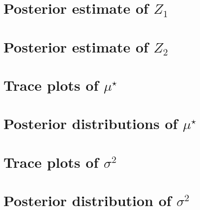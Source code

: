 \documentclass[10pt]{article} %
\begin{document}
\newpage
\section{Posterior estimate of $Z_1$}
\begin{figure}[H]
  \begin{center}  %
  \end{center}
\end{figure}

\newpage
\section{Posterior estimate of $Z_2$}
\begin{figure}[H]
  \begin{center}  %
  \end{center}
\end{figure}

\newpage
\section{Trace plots of $\mu^\star$}
\begin{figure}[H]
  \begin{center}  %
  \end{center}
\end{figure}

\newpage
\section{Posterior distributions of $\mu^\star$}
\begin{figure}[H]
  \begin{center}  %
  \end{center}
\end{figure}

\newpage
\section{Trace plots of $\sigma^2$}
\begin{figure}[H]
  \begin{center}  %
  \end{center}
\end{figure}

\newpage
\section{Posterior distribution of $\sigma^2$}
\begin{figure}[H]
  \begin{center}  %
  \end{center}
\end{figure}
\end{document}
